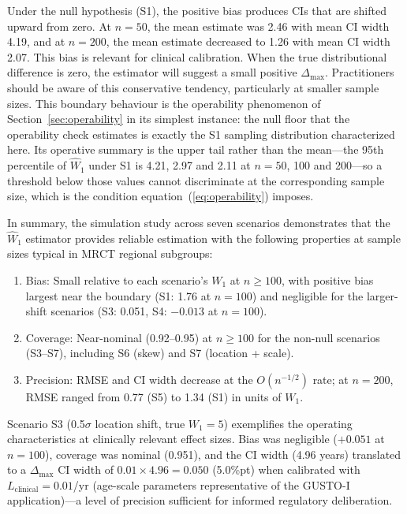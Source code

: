 \documentclass[AMA,Times1COL]{WileyNJDv5}
\begin{document}
Under the null hypothesis (S1), the positive bias produces CIs that are shifted upward from zero. At $n = 50$, the mean estimate was 2.46 with mean CI width 4.19, and at $n = 200$, the mean estimate decreased to 1.26 with mean CI width 2.07. This bias is relevant for clinical calibration. When the true distributional difference is zero, the estimator will suggest a small positive $\Delta_{\max}$. Practitioners should be aware of this conservative tendency, particularly at smaller sample sizes. This boundary behaviour is the operability phenomenon of Section~\ref{sec:operability} in its simplest instance: the null floor that the operability check estimates is exactly the S1 sampling distribution characterized here. Its operative summary is the upper tail rather than the mean---the 95th percentile of $\widehat{W}_1$ under S1 is 4.21, 2.97 and 2.11 at $n = 50$, 100 and 200---so a threshold below those values cannot discriminate at the corresponding sample size, which is the condition equation~(\ref{eq:operability}) imposes.

In summary, the simulation study across seven scenarios demonstrates that the $\widehat{W}_1$ estimator provides reliable estimation with the following properties at sample sizes typical in MRCT regional subgroups:
\begin{enumerate}[1.]
\item Bias: Small relative to each scenario's $W_1$ at $n \geq 100$, with positive bias largest near the boundary (S1: 1.76 at $n = 100$) and negligible for the larger-shift scenarios (S3: 0.051, S4: $-0.013$ at $n = 100$).
\item Coverage: Near-nominal (0.92--0.95) at $n \geq 100$ for the non-null scenarios (S3--S7), including S6 (skew) and S7 (location + scale).
\item Precision: RMSE and CI width decrease at the $O(n^{-1/2})$ rate; at $n = 200$, RMSE ranged from 0.77 (S5) to 1.34 (S1) in units of $W_1$.
\end{enumerate}

Scenario S3 (0.5$\sigma$ location shift, true $W_1 = 5$) exemplifies the operating characteristics at clinically relevant effect sizes. Bias was negligible ($+0.051$ at $n = 100$), coverage was nominal (0.951), and the CI width (4.96 years) translated to a $\Delta_{\max}$ CI width of $0.01 \times 4.96 = 0.050$ (5.0\%pt) when calibrated with $L_{\text{clinical}} = 0.01$/yr (age-scale parameters representative of the GUSTO-I application)---a level of precision sufficient for informed regulatory deliberation.
\end{document}
